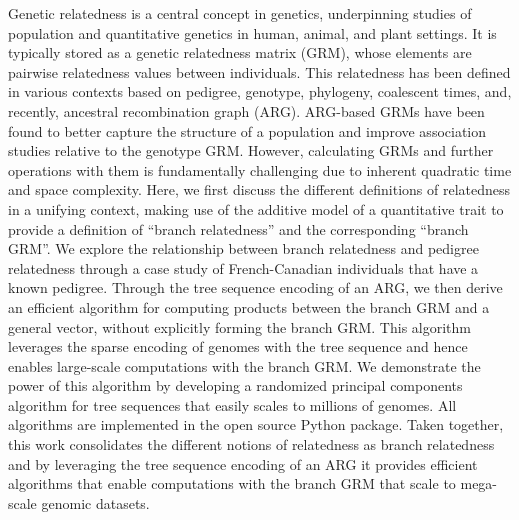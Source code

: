 Genetic relatedness is a central concept in genetics,
underpinning studies of population and quantitative genetics in human, animal, and plant settings.
%
It is typically stored as a genetic relatedness matrix (GRM),
whose elements are pairwise relatedness values between individuals.
%
This relatedness has been defined in various contexts
based on pedigree, genotype, phylogeny, coalescent times,
and, recently, ancestral recombination graph (ARG).
%
ARG-based GRMs have been found to better capture the structure of a population and
improve association studies relative to the genotype GRM.
%
However, calculating GRMs and further operations with them is fundamentally challenging
due to inherent quadratic time and space complexity.
%
Here, we first discuss the different definitions of relatedness in a unifying context,
making use of the additive model of a quantitative trait
to provide a definition of ``branch relatedness'' and the corresponding ``branch GRM''.
%
We explore the relationship between branch relatedness and pedigree relatedness through a case study of French-Canadian individuals that have a known pedigree.
%
Through the tree sequence encoding of an ARG, we then derive an efficient algorithm for computing products between the branch GRM and a general vector, without explicitly forming the branch GRM.
%
This algorithm leverages the sparse encoding of genomes with the tree sequence and hence enables large-scale computations with the branch GRM.
%
We demonstrate the power of this algorithm by developing
a randomized principal components algorithm for tree sequences
that easily scales to millions of genomes.
%
All algorithms are implemented in the open source \tskit{} Python package.
%
Taken together, this work consolidates the different notions of relatedness as branch relatedness
and by leveraging the tree sequence encoding of an ARG it provides efficient algorithms
that enable computations with the branch GRM that scale to mega-scale genomic datasets.
